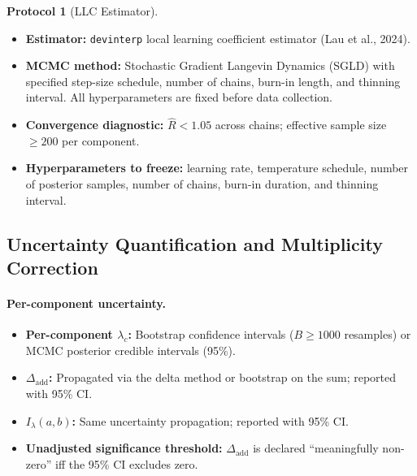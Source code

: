 \documentclass[11pt,a4paper]{article}
\theoremstyle{definition}
\newtheorem{protocol}[theorem]{Protocol}
\theoremstyle{remark}
\newcommand{\LLC}{\lambda}
\newcommand{\Dadd}{\Delta_{\mathrm{add}}}
\newcommand{\Ilambda}{I_{\lambda}}
\begin{document}
\begin{protocol}[LLC Estimator]\label{prot:llc}
  \leavevmode
  \begin{itemize}
    \item \textbf{Estimator:} \texttt{devinterp} local learning coefficient
      estimator (Lau et al., 2024).
    \item \textbf{MCMC method:} Stochastic Gradient Langevin Dynamics (SGLD)
      with specified step-size schedule, number of chains, burn-in length, and
      thinning interval.  All hyperparameters are fixed before data collection.
    \item \textbf{Convergence diagnostic:} $\hat{R} < 1.05$ across chains;
      effective sample size $\geq 200$ per component.
    \item \textbf{Hyperparameters to freeze:} learning rate, temperature
      schedule, number of posterior samples, number of chains, burn-in
      duration, and thinning interval.
  \end{itemize}
\end{protocol}

\subsection{Uncertainty Quantification and Multiplicity Correction}%
\label{subsec:multiplicity}

\paragraph{Per-component uncertainty.}
\begin{itemize}
  \item \textbf{Per-component $\LLC_c$:} Bootstrap confidence intervals
    ($B \geq 1000$ resamples) or MCMC posterior credible intervals (95\%).
  \item \textbf{$\Dadd$:} Propagated via the delta method or bootstrap on the
    sum; reported with 95\% CI.
  \item \textbf{$\Ilambda(a, b)$:} Same uncertainty propagation; reported
    with 95\% CI.
  \item \textbf{Unadjusted significance threshold:} $\Dadd$ is declared
    ``meaningfully non-zero'' iff the 95\% CI excludes zero.
\end{itemize}
\end{document}
